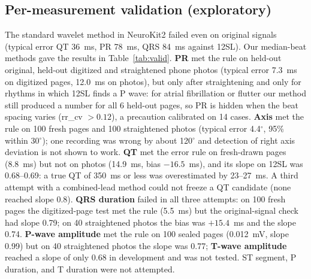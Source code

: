\documentclass[conference]{IEEEtran}
\begin{document}
\subsection{Per-measurement validation (exploratory)}
The standard wavelet method in NeuroKit2 failed even on original signals (typical error QT 36~ms, PR 78~ms, QRS 84~ms against 12SL). Our median-beat methods gave the results in Table~\ref{tab:valid}. \textbf{PR} met the rule on held-out original, held-out digitized and straightened phone photos (typical error 7.3~ms on digitized pages, 12.0~ms on photos), but only after straightening and only for rhythms in which 12SL finds a P wave: for atrial fibrillation or flutter our method still produced a number for all 6 held-out pages, so PR is hidden when the beat spacing varies (rr\_cv $>0.12$), a precaution calibrated on 14 cases. \textbf{Axis} met the rule on 100 fresh pages and 100 straightened photos (typical error 4.4$^\circ$, 95\% within 30$^\circ$); one recording was wrong by about 120$^\circ$ and detection of right axis deviation is not shown to work. \textbf{QT} met the error rule on fresh-drawn pages (8.8~ms) but not on photos (14.9~ms, bias $-16.5$~ms), and its slope on 12SL was 0.68--0.69: a true QT of 350~ms or less was overestimated by 23--27~ms. A third attempt with a combined-lead method could not freeze a QT candidate (none reached slope 0.8). \textbf{QRS duration} failed in all three attempts: on 100 fresh pages the digitized-page test met the rule (5.5~ms) but the original-signal check had slope 0.79; on 40 straightened photos the bias was $+15.4$~ms and the slope 0.74. \textbf{P-wave amplitude} met the rule on 100 sealed pages (0.012~mV, slope 0.99) but on 40 straightened photos the slope was 0.77; \textbf{T-wave amplitude} reached a slope of only 0.68 in development and was not tested. ST segment, P duration, and T duration were not attempted.
\end{document}
